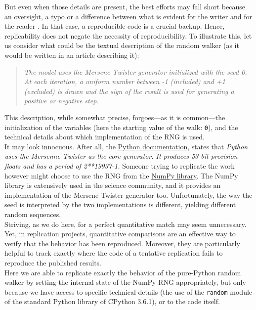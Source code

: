 \documentclass[a4paper,11pt]{article}
\begin{document}
But even when those details are present, the best efforts may fall short because
an oversight, a typo or a difference between what is evident for the writer
and for the reader \citep{Mesnard:2016}. In that case, a reproducible code is a crucial backup. Hence,
replicability does not negate the necessity of reproducibility. To illustrate
this, let us consider what could be the textual description of the random
walker (as it would be written in an article describing it):
%
\begin{quotation}
{\em The model uses the Mersene Twister generator initialized with the seed 0. At each iteration, a uniform number between -1 (included) and +1 (excluded) is drawn and the sign of the result is used for generating a positive or negative step.}
\end{quotation}
%
This description, while somewhat precise, forgoes---as it is common---the initialization of the variables (here the starting value of the walk: {\tt 0}), and the technical details about which implementation of the RNG is used.\\

It may look innocuous. After all, the
\href{https://docs.python.org/3.6/library/random.html}{Python documentation},
states that {\em Python uses the Mersenne Twister as the core generator. It produces
53-bit precision floats and has a period of 2**19937-1.} Someone trying to replicate the work however might choose to use the RNG from the \href{http://www.numpy.org/}{NumPy library}.  The NumPy library is extensively used in the science community, and it provides an implementation of the Mersene Twister generator too. Unfortunately, the way the seed is interpreted by the two implementations is different, yielding different random sequences.\\

Striving, as we do here, for a perfect quantitative match may seem unnecessary. Yet, in replication projects, quantitative comparisons are an effective way to verify that the behavior has been reproduced. Moreover, they are particularly helpful to track exactly where the code of a tentative replication fails to reproduce the published results.\\

Here we are able to replicate exactly the behavior of the pure-Python random walker by setting the internal state of the NumPy RNG appropriately, but only because we have access to specific technical details (the use of the {\tt random} module of the standard Python library of CPython 3.6.1), or to the code itself.\\
\end{document}
